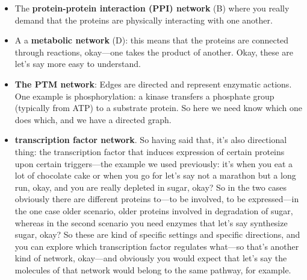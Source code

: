 \begin{itemize}
\item The \textbf{protein-protein interaction (PPI) network} (B) where you really demand that the proteins are physically interacting with one another.
\item A a \textbf{metabolic network} (D):  this means that the proteins are connected through reactions, okay—one takes the product of another. Okay, these are let's say more easy to understand.

\item \textbf{The PTM network}: Edges are directed and represent enzymatic actions. One example is phosphorylation: a kinase transfers a phosphate group (typically from ATP) to a substrate protein. So here we need know which one does which, and we have a directed graph. 

\item  \textbf{transcription factor network}. So having said that, it’s also directional thing: the transcription factor that induces expression of certain proteins upon certain triggers—the example we used previously: it’s when you eat a lot of chocolate cake or when you go for let’s say not a marathon but a long run, okay, and you are really depleted in sugar, okay? So in the two cases obviously there are different proteins to—to be involved, to be expressed—in the one case older scenario, older proteins involved in degradation of sugar, whereas in the second scenario you need enzymes that let's say synthesize sugar, okay? So these are kind of specific settings and specific directions, and you can explore which transcription factor regulates what—so that’s another kind of network, okay—and obviously you would expect that let’s say the molecules of that network would belong to the same pathway, for example.


\end{itemize}
